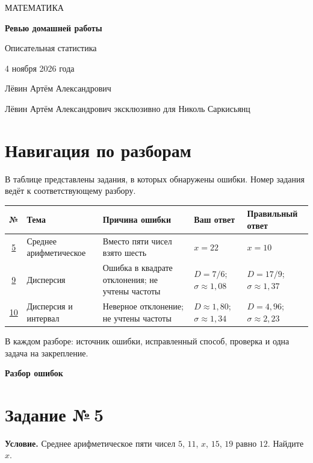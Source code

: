 \documentclass[a4paper,12pt]{article}
\newcommand{\tasktitle}[1]{\phantomsection\label{task:#1}\section*{Задание №\,#1}}
\begin{document}
\thispagestyle{empty}
\begin{center}
\vspace*{54mm}
{\color{accent}\Large МАТЕМАТИКА}\par
\vspace{13mm}
{\Huge\bfseries Ревью домашней работы}\par
\vspace{12mm}
{\Large Описательная статистика}\par
\vspace{27mm}
{\large 4 ноября 2026 года}\par
\vspace{9mm}
{\normalsize Лёвин Артём Александрович}\par
\vfill
{\small Лёвин Артём Александрович эксклюзивно для Николь Саркисьянц}\par
\vspace{10mm}
\end{center}
\newpage
\section*{Навигация по разборам}
В таблице представлены задания, в которых обнаружены ошибки. Номер задания ведёт к соответствующему разбору.

\vspace{6mm}
\footnotesize
\renewcommand{\arraystretch}{1.7}
\begin{tabularx}{\linewidth}{@{}c p{2.45cm} X p{2.75cm} p{3.05cm}@{}}
\toprule
№ & Тема & Причина ошибки & Ваш ответ & Правильный ответ\\
\midrule
\hyperref[task:5]{5} & Среднее арифметическое & Вместо пяти чисел взято шесть & $x=22$ & $x=10$\\
\hyperref[task:9]{9} & Дисперсия & Ошибка в квадрате отклонения; не учтены частоты & $D=7/6$; $\sigma\approx1{,}08$ & $D=17/9$; $\sigma\approx1{,}37$\\
\hyperref[task:10]{10} & Дисперсия и интервал & Неверное отклонение; не учтены частоты & $D\approx1{,}80$; $\sigma\approx1{,}34$ & $D=4{,}96$; $\sigma\approx2{,}23$\\
\bottomrule
\end{tabularx}
\normalsize
\vfill
\begin{center}\small\color{ink}В каждом разборе: источник ошибки, исправленный способ, проверка и одна задача на закрепление.\end{center}
\newpage
\thispagestyle{empty}
\vspace*{0.33\textheight}
\begin{center}
{\Huge\color{accent}\bfseries Разбор ошибок}
\end{center}
\newpage
\tasktitle{5}
\textbf{Условие.} Среднее арифметическое пяти чисел $5$, $11$, $x$, $15$, $19$ равно $12$. Найдите $x$.
\end{document}
